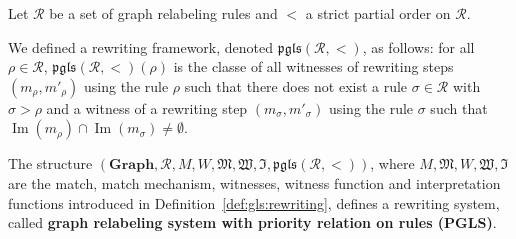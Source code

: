     \begin{definition}
      \label{def:pgls_framework}
    
      Let $\mathcal{R}$ be a set of graph relabeling rules and $<$ a strict partial order on $\mathcal{R}$.
    
      We defined a rewriting framework, denoted $\mathfrak{pgls}(\mathcal{R},<)$, as follows: for all $\rho \in \mathcal{R}$,
      $\mathfrak{pgls}(\mathcal{R},<)(\rho)$ is the classe of all witnesses of rewriting steps
      $\left(  m_\rho, m'_\rho \right)$ using the rule $\rho$
      such that there does not exist 
      a rule $\sigma \in \mathcal{R}$ with $\sigma > \rho$ and a witness of a rewriting step
      $\left(  m_\sigma, m'_\sigma \right)$ using the rule $\sigma$ such that 
      $\operatorname{Im}(m_\rho) \cap \operatorname{Im}(m_\sigma) \neq \emptyset$.
 
      The structure $(\mathbf{Graph},\mathcal{R},M,W,\mathfrak{M},\mathfrak{W},\mathfrak{I}, \mathfrak{pgls}(\mathcal{R},<))$, where $M, \mathfrak{M}, W , \mathfrak{W}, \mathfrak{I}$ are the match, match mechanism, witnesses, witness function and interpretation functions introduced in Definition~\ref{def:gls:rewriting}, defines a rewriting system, called \textbf{graph relabeling system with priority relation on rules (PGLS)}. 

    \end{definition}
     
